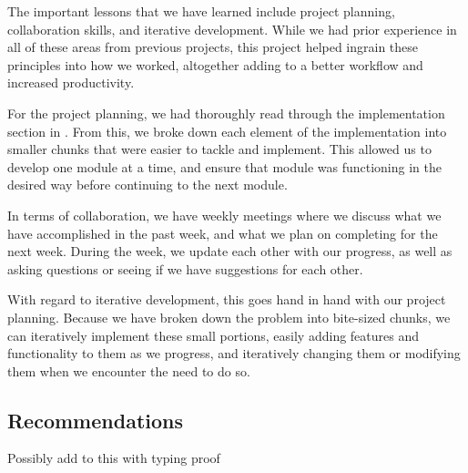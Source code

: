 \documentclass[11pt]{article} %
\begin{document}
The important lessons that we have learned include project planning,
collaboration skills, and iterative development. While we had prior
experience in all of these areas from previous projects, this project
helped ingrain these principles into how we worked, altogether adding to
a better workflow and increased productivity. 

For the project planning, we had thoroughly read through the
implementation section in \cite{shirvanian2d2fa}. From this, we 
broke down each element of the implementation into smaller chunks that
were easier to tackle and implement. This allowed us to develop one
module at a time, and ensure that module was functioning in the desired
way before continuing to the next module. 

In terms of collaboration, we have weekly meetings where we discuss what
we have accomplished in the past week, and what we plan on completing
for the next week. During the week, we update each other with our
progress, as well as asking questions or seeing if we have suggestions
for each other. 

With regard to iterative development, this goes hand in hand with our
project planning. Because we have broken down the problem into
bite-sized chunks, we can iteratively implement these small portions,
easily adding features and functionality to them as we progress, and
iteratively changing them or modifying them when we encounter the need
to do so.

\subsection{Recommendations}


Possibly add to this with typing proof \cite{liuTypingProof}



\end{document}
